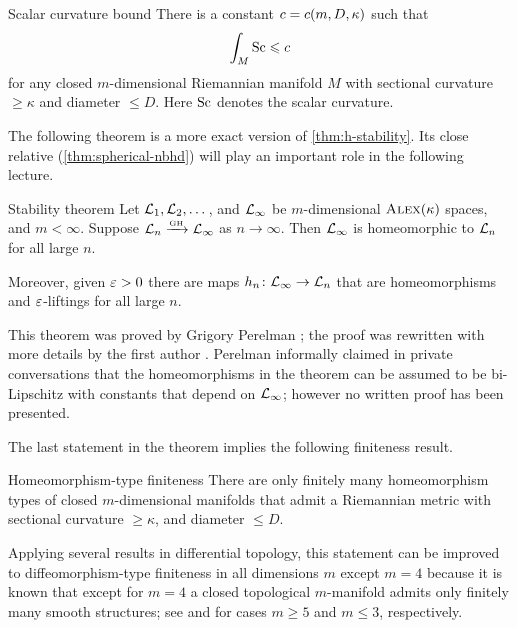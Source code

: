 \begin{thm}{Scalar curvature bound}
There is a constant $c=c(m,D,\kappa)$ such that 
\[\int_M\mathrm{Sc}\leqslant c\]
for any closed $m$-dimensional Riemannian manifold $M$ with sectional curvature $\ge \kappa$ and diameter $\le D$.
Here $\mathrm{Sc}$ denotes the scalar curvature.
\end{thm}

The following theorem is a more exact version of \ref{thm:h-stability}.
Its close relative (\ref{thm:spherical-nbhd}) will play an important role in the following lecture.

\begin{thm}{Stability theorem}\label{thm:stability}
Let $\mathcal{L}_1,\mathcal{L}_2,\dots$, and $\mathcal{L}_\infty$ be  $m$-dimensional $\textsc{Alex}(\kappa)$ spaces, and $m<\infty$.
Suppose $\mathcal{L}_n\xrightarrow{\mbox{\tiny\rm GH}} \mathcal{L}_\infty$ as $n\to \infty$.
Then $\mathcal{L}_\infty$ is homeomorphic to $\mathcal{L}_n$ for all large $n$.

Moreover, given $\varepsilon>0$ there are maps $h_n\colon\mathcal{L}_\infty\to \mathcal{L}_n$ that are homeomorphisms and $\varepsilon$-liftings for all large $n$.
\end{thm}

This theorem was proved by Grigory Perelman \cite{perelman1991};
the proof was rewritten with more details by the first author \cite{kapovitch}.
Perelman  informally claimed in private conversations that the homeomorphisms in the theorem can be assumed to be bi-Lipschitz with constants that depend on $\mathcal{L}_\infty$;
however no written proof has been presented.

The last statement in the theorem implies the following finiteness result.

\begin{thm}{Homeomorphism-type finiteness}
There are only finitely many homeomorphism types of closed $m$-dimensional manifolds that admit a Riemannian metric with sectional curvature $\ge \kappa$, and diameter $\le D$.
\end{thm}

Applying several results in differential topology, this statement can be improved to diffeomorphism-type finiteness in all dimensions $m$ except $m=4$ because it is known that except for $m=4$ a closed topological $m$-manifold admits only finitely many smooth structures; see \cite{kirby-siebenmann} and  \cite{moise,thurston} for cases $m\ge 5$ and $m\le 3$, respectively.


